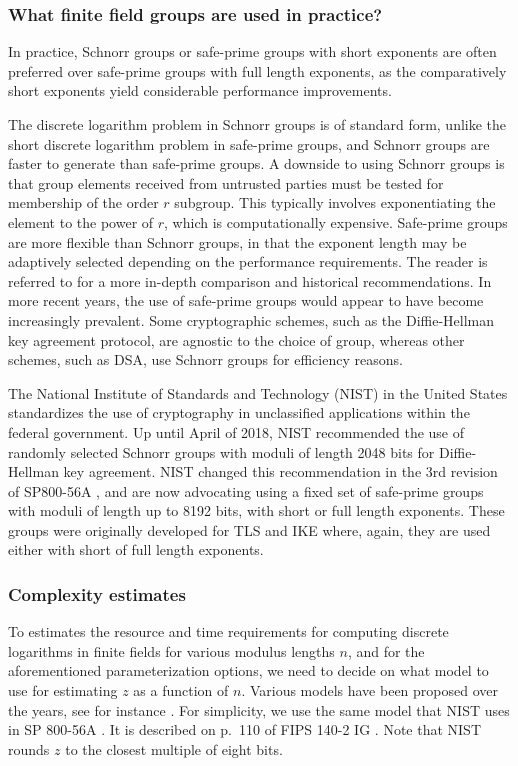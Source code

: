 \documentclass[superscriptaddress,notitlepage,longbibliography]{revtex4-1}
\theoremstyle{definition}
\theoremstyle{definition}
\begin{document}
\subsubsection{What finite field groups are used in practice?}
In practice, Schnorr groups or safe-prime groups with short exponents are often preferred over safe-prime groups with full length exponents, as the comparatively short exponents yield considerable performance improvements.

The discrete logarithm problem in Schnorr groups is of standard form, unlike the short discrete logarithm problem in safe-prime groups, and Schnorr groups are faster to generate than safe-prime groups. A downside to using Schnorr groups is that group elements received from untrusted parties must be tested for membership of the order $r$ subgroup. This typically involves exponentiating the element to the power of $r$, which is computationally expensive. Safe-prime groups are more flexible than Schnorr groups, in that the exponent length may be adaptively selected depending on the performance requirements. The reader is referred to \cite{oorschot} for a more in-depth comparison and historical recommendations. In more recent years, the use of safe-prime groups would appear to have become increasingly prevalent. Some cryptographic schemes, such as the Diffie-Hellman key agreement protocol, are agnostic to the choice of group, whereas other schemes, such as DSA, use Schnorr groups for efficiency reasons.

The National Institute of Standards and Technology (NIST) in the United States standardizes the use of crypto\-graphy in unclassified applications within the federal government. Up until April of 2018, NIST recommended the use of randomly selected Schnorr groups with moduli of length 2048 bits for Diffie-Hellman key agreement. NIST changed this recommendation in the 3rd revision of SP800-56A \cite{nist-sp-800-56-part1-rev3-2018}, and are now advocating using a fixed set of safe-prime groups with moduli of length up to 8192 bits, with short or full length exponents. These groups were originally developed for TLS \cite{rfc-tls} and IKE \cite{rfc-ike} where, again, they are used either with short of full length exponents.

\subsubsection{Complexity estimates}
To estimates the resource and time requirements for computing discrete logarithms in finite fields for various modulus lengths $n$, and for the aforementioned parameterization options, we need to decide on what model to use for estimating $z$ as a function of $n$. Various models have been proposed over the years, see for instance \cite{lenstra-verheul-model-2001, lenstra-model-2004, keylength2019}. For simplicity, we use the same model that NIST uses in SP 800-56A \cite{nist-sp-800-56-part1-rev3-2018}. It is described on p.~110 of FIPS 140-2 IG \cite{fips-140-2-IG}. Note that NIST rounds $z$ to the closest multiple of eight bits.
\end{document}
